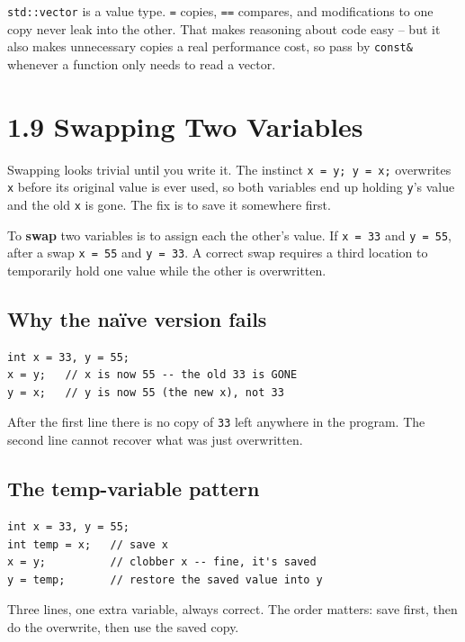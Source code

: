 \documentclass[11pt]{article}
\begin{document}
\begin{ideabox}
\texttt{std::vector} is a value type. \texttt{=} copies,
\texttt{==} compares, and modifications to one copy never leak into
the other. That makes reasoning about code easy -- but it also makes
unnecessary copies a real performance cost, so pass by
\texttt{const\&} whenever a function only needs to read a vector.
\end{ideabox}

\section{1.9 Swapping Two Variables}

Swapping looks trivial until you write it. The instinct
\texttt{x = y; y = x;} overwrites \texttt{x} before its original value is
ever used, so both variables end up holding \texttt{y}'s value and the old
\texttt{x} is gone. The fix is to save it somewhere first.

\begin{defnbox}[Swap]
To \textbf{swap} two variables is to assign each the other's value. If
\texttt{x = 33} and \texttt{y = 55}, after a swap \texttt{x = 55} and
\texttt{y = 33}. A correct swap requires a third location to temporarily
hold one value while the other is overwritten.
\end{defnbox}

\subsection{Why the na\"ive version fails}

\begin{examplebox}
\begin{verbatim}
int x = 33, y = 55;
x = y;   // x is now 55 -- the old 33 is GONE
y = x;   // y is now 55 (the new x), not 33
\end{verbatim}
After the first line there is no copy of \texttt{33} left anywhere in the
program. The second line cannot recover what was just overwritten.
\end{examplebox}

\subsection{The temp-variable pattern}

\begin{examplebox}
\begin{verbatim}
int x = 33, y = 55;
int temp = x;   // save x
x = y;          // clobber x -- fine, it's saved
y = temp;       // restore the saved value into y
\end{verbatim}
Three lines, one extra variable, always correct. The order matters:
save first, then do the overwrite, then use the saved copy.
\end{examplebox}
\end{document}
